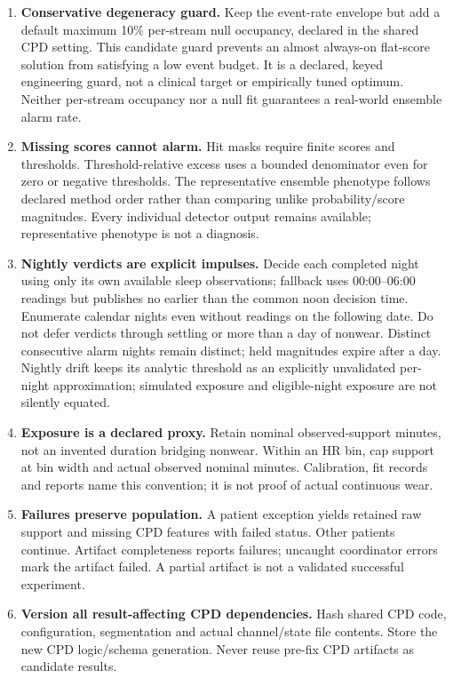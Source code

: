 \documentclass[11pt,a4paper]{article}
\newcommand{\code}[1]{\texttt{\detokenize{#1}}}
\begin{document}
\begin{enumerate}
long as the baseline window, restart burn-in in a new epoch. Short healthy windows
do not produce zero-centered unit-scale pseudo-baselines. Failed/insufficient null
calibrations disable the affected simulated streams, with a recorded reason.
\item \textbf{Conservative degeneracy guard.} Keep the event-rate envelope but add
a default maximum 10\% per-stream null occupancy, declared in the shared CPD
\code{max_null_occupancy} setting. This candidate guard prevents an almost
always-on flat-score solution from satisfying a low event budget. It is a declared,
keyed engineering guard, not a clinical target or empirically tuned optimum. Neither
per-stream occupancy nor a null fit guarantees a real-world ensemble alarm rate.
\item \textbf{Missing scores cannot alarm.} Hit masks require finite scores and
thresholds. Threshold-relative excess uses a bounded denominator even for zero or
negative thresholds. The representative ensemble phenotype follows declared method
order rather than comparing unlike probability/score magnitudes. Every individual
detector output remains available; representative phenotype is not a diagnosis.
\item \textbf{Nightly verdicts are explicit impulses.} Decide each completed night
using only its own available sleep observations; fallback uses 00:00--06:00 readings
but publishes no earlier than the common noon decision time. Enumerate calendar
nights even without readings on the following date. Do not defer verdicts through
settling or more than a day of nonwear. Distinct consecutive alarm nights remain
distinct; held magnitudes expire after a day. Nightly drift keeps its analytic
threshold as an explicitly unvalidated per-night approximation; simulated exposure
and eligible-night exposure are not silently equated.
\item \textbf{Exposure is a declared proxy.} Retain nominal observed-support minutes,
not an invented duration bridging nonwear. Within an HR bin, cap support at bin
width and actual observed nominal minutes. Calibration, fit records and reports
name this convention; it is not proof of actual continuous wear.
\item \textbf{Failures preserve population.} A patient exception yields retained raw
support and missing CPD features with failed status. Other patients continue.
Artifact completeness reports failures; uncaught coordinator errors mark the artifact
failed. A partial artifact is not a validated successful experiment.
\item \textbf{Version all result-affecting CPD dependencies.} Hash shared CPD code,
configuration, segmentation and actual channel/state file contents. Store the new
CPD logic/schema generation. Never reuse pre-fix CPD artifacts as candidate results.
\end{enumerate}
\end{document}
